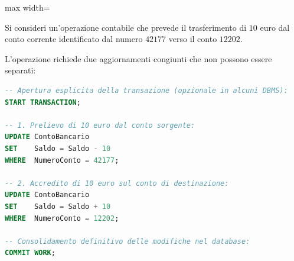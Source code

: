 \documentclass[12pt]{extarticle}
\begin{document}
\begin{center}
\begin{adjustbox}{max width=\linewidth}
\end{adjustbox}
\end{center}

\noindent Si consideri un'operazione contabile che prevede il trasferimento di $10$ euro dal conto corrente identificato dal numero $42177$ verso il conto $12202$. 

\medskip
\noindent L'operazione richiede due aggiornamenti congiunti che non possono essere separati:
\begin{lstlisting}[language=SQL, caption={Esempio di transazione bancaria completa}]
-- Apertura esplicita della transazione (opzionale in alcuni DBMS):
START TRANSACTION;

-- 1. Prelievo di 10 euro dal conto sorgente:
UPDATE ContoBancario
SET    Saldo = Saldo - 10
WHERE  NumeroConto = 42177;

-- 2. Accredito di 10 euro sul conto di destinazione:
UPDATE ContoBancario
SET    Saldo = Saldo + 10
WHERE  NumeroConto = 12202;

-- Consolidamento definitivo delle modifiche nel database:
COMMIT WORK;
\end{lstlisting}
\end{document}
